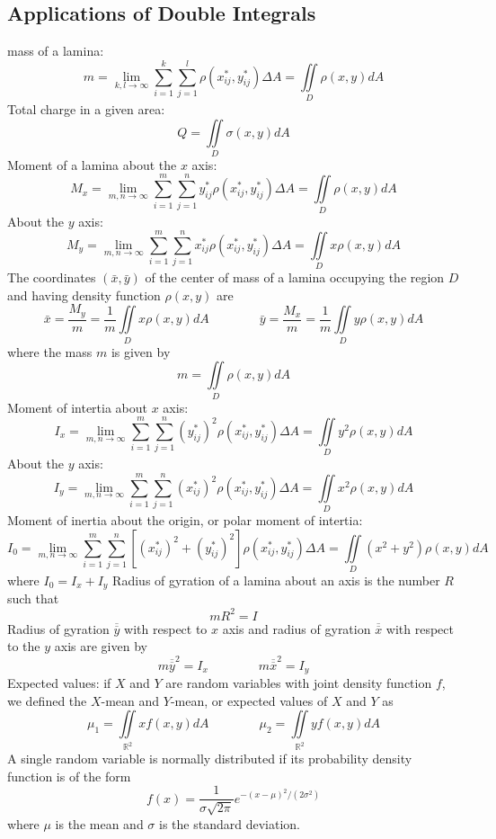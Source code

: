 \documentclass{article}
\begin{document}
    \subsection{Applications of Double Integrals}
    \begin{outline}
        \1 mass of a lamina: \[m=\lim_{k,l\to\infty}\sum^k_{i=1}\sum^l_{j=1}\rho(x^*_{ij},y^*_{ij})\Delta A=\iint\limits_D\rho(x,y)dA\]
        \1 Total charge in a given area: \[Q=\iint\limits_D\sigma(x,y)dA\]
        \1 Moment of a lamina about the $x$ axis: \[M_x=\lim_{m,n\to\infty}\sum^m_{i=1}\sum^n_{j=1}y^*_{ij}\rho(x^*_{ij},y^*_{ij})\Delta A=\iint\limits_D\rho(x,y)dA\]
        \1 About the $y$ axis: \[M_y=\lim_{m,n\to\infty}\sum^m_{i=1}\sum^n_{j=1}x^*_{ij}\rho(x^*_{ij},y^*_{ij})\Delta A=\iint\limits_Dx\rho(x,y)dA\]
        \1 The coordinates \((\bar x,\bar y)\) of the center of mass of a lamina occupying the region $D$ and having density function \(\rho(x,y)\) are \[\bar x=\dfrac{M_y}{m}=\dfrac{1}{m}\iint\limits_Dx\rho(x,y)dA\qquad\qquad\bar y=\dfrac{M_x}{m}=\dfrac{1}{m}\iint\limits_Dy\rho(x,y)dA\] where the mass $m$ is given by \[m=\iint\limits_D\rho(x,y)dA\]
        \1 Moment of intertia about $x$ axis: \[I_x=\lim_{m,n\to\infty}\sum^m_{i=1}\sum^n_{j=1}(y^*_{ij})^2\rho(x^*_{ij},y^*_{ij})\Delta A=\iint\limits_Dy^2\rho(x,y)dA\]
        \1 About the $y$ axis: \[I_y=\lim_{m,n\to\infty}\sum^m_{i=1}\sum^n_{j=1}(x^*_{ij})^2\rho(x^*_{ij},y^*_{ij})\Delta A=\iint\limits_Dx^2\rho(x,y)dA\]
        \1 Moment of inertia about the origin, or polar moment of intertia: \[I_0=\lim_{m,n\to\infty}\sum^m_{i=1}\sum^n_{j=1}\left[(x^*_{ij})^2+(y^*_{ij})^2\right]\rho(x^*_{ij},y^*_{ij})\Delta A=\iint\limits_D(x^2+y^2)\rho(x,y)dA\] where \(I_0=I_x+I_y\)
        \1 Radius of gyration of a lamina about an axis is the number $R$ such that \[mR^2=I\]
        \1 Radius of gyration \(\overline{\overline{y}}\) with respect to $x$ axis and radius of gyration \(\overline{\overline{x}}\) with respect to the $y$ axis are given by \[m\overline{\overline{y}}^2=I_x\qquad\qquad m\overline{\overline{x}}^2=I_y\]
        \1 Expected values: if $X$ and $Y$ are random variables with joint density function $f$, we defined the $X$-mean and $Y$-mean, or expected values of $X$ and $Y$ as \[\mu_1=\iint\limits_{\mathbb R^2}xf(x,y)dA\qquad\qquad\mu_2=\iint\limits_{\mathbb R^2}yf(x,y)dA\]
        \1 A single random variable is normally distributed if its probability density function is of the form \[f(x)=\dfrac{1}{\sigma\sqrt{2\pi}}e^{-(x-\mu)^2/(2\sigma^2)}\] where \(\mu\) is the mean and \(\sigma\) is the standard deviation. 
    \end{outline}
\end{document}
